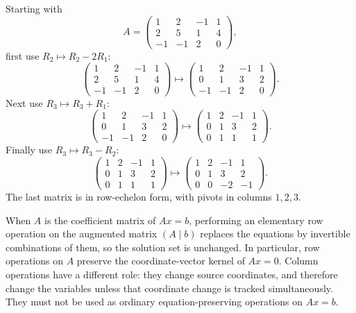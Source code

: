\begin{example}
Starting with
\[
A=\begin{pmatrix}1&2&-1&1\\2&5&1&4\\-1&-1&2&0\end{pmatrix},
\]
first use \(R_2\mapsto R_2-2R_1\):
\[
\begin{pmatrix}1&2&-1&1\\2&5&1&4\\-1&-1&2&0\end{pmatrix}
\longmapsto
\begin{pmatrix}1&2&-1&1\\0&1&3&2\\-1&-1&2&0\end{pmatrix}.
\]
Next use \(R_3\mapsto R_3+R_1\):
\[
\begin{pmatrix}1&2&-1&1\\0&1&3&2\\-1&-1&2&0\end{pmatrix}
\longmapsto
\begin{pmatrix}1&2&-1&1\\0&1&3&2\\0&1&1&1\end{pmatrix}.
\]
Finally use \(R_3\mapsto R_3-R_2\):
\[
\begin{pmatrix}1&2&-1&1\\0&1&3&2\\0&1&1&1\end{pmatrix}
\longmapsto
\begin{pmatrix}1&2&-1&1\\0&1&3&2\\0&0&-2&-1\end{pmatrix}.
\]
The last matrix is in row-echelon form, with pivots in columns \(1,2,3\).
\end{example}

When \(A\) is the coefficient matrix of \(Ax=b\), performing an elementary
row operation on the augmented matrix \((A\mid b)\) replaces the equations by
invertible combinations of them, so the solution set is unchanged.  In
particular, row operations on \(A\) preserve the coordinate-vector kernel of
\(Ax=0\).  Column operations have a different role: they change source
coordinates, and therefore change the variables unless that coordinate change
is tracked simultaneously.  They must not be used as ordinary
equation-preserving operations on \(Ax=b\).

